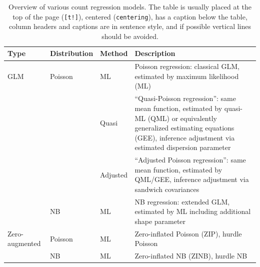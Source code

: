 \documentclass[article]{jss}
\begin{document}
\begin{table}[t!]
\centering
\begin{tabular}{lllp{7.4cm}}
\hline
Type           & Distribution & Method   & Description \\ \hline
GLM            & Poisson      & ML       & Poisson regression: classical GLM,
                                           estimated by maximum likelihood (ML) \\
               &              & Quasi    & ``Quasi-Poisson regression'':
                                           same mean function, estimated by
                                           quasi-ML (QML) or equivalently
                                           generalized estimating equations (GEE),
                                           inference adjustment via estimated
                                           dispersion parameter \\
               &              & Adjusted & ``Adjusted Poisson regression'':
                                           same mean function, estimated by
                                           QML/GEE, inference adjustment via
                                           sandwich covariances\\
               & NB           & ML       & NB regression: extended GLM,
                                           estimated by ML including additional
                                           shape parameter \\ \hline
Zero-augmented & Poisson      & ML       & Zero-inflated Poisson (ZIP),
                                           hurdle Poisson \\
               & NB           & ML       & Zero-inflated NB (ZINB),
                                           hurdle NB \\ \hline
\end{tabular}
\caption{\label{tab:overview} Overview of various count regression models. The
table is usually placed at the top of the page (\texttt{[t!]}), centered
(\texttt{centering}), has a caption below the table, column headers and captions
are in sentence style, and if possible vertical lines should be avoided.}
\end{table}



\end{document}
